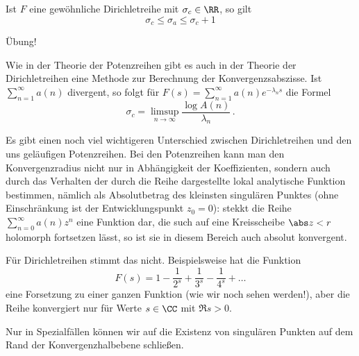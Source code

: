 \begin{satz}
	Ist $F$ eine gewöhnliche Dirichletreihe mit $\sigma_c \in \RR$, so gilt
	\[
		\sigma_c \leq \sigma_a \leq \sigma_c + 1
	\]
\end{satz}

\begin{bewe}
	Übung!
\end{bewe}

\begin{beme}
	Wie in der Theorie der Potenzreihen gibt es auch in der Theorie der Dirichletreihen eine Methode zur Berechnung der Konvergenzsabszisse.
	Ist $\sum_{n=1}^\infty a(n)$ divergent, so folgt für $F(s) = \sum_{n=1}^\infty a(n) e^{-\lambda_n s}$ die Formel
	\[
		\sigma_c = \limsup_{n\to\infty} \frac{\log{A(n)}}{\lambda_n}
		\,.
	\]
	
	Es gibt einen noch viel wichtigeren Unterschied zwischen Dirichletreihen und den uns geläufigen Potenzreihen.
	Bei den Potenzreihen kann man den Konvergenzradius nicht nur in Abhängigkeit der Koeffizienten, sondern auch durch das Verhalten der durch die Reihe dargestellte lokal analytische Funktion bestimmen, nämlich als Absolutbetrag des kleinsten singulären Punktes (ohne Einschränkung ist der Entwicklungspunkt $z_0 = 0$): stekkt die Reihe $\sum_{n=0}^\infty a(n)z^n$ eine Funktion dar, die such auf eine Kreisscheibe $\abs z < r$ holomorph fortsetzen lässt, so ist sie in diesem Bereich auch absolut konvergent.
	
	Für Dirichletreihen stimmt das nicht.
	Beispielsweise hat die Funktion
	\[
		F(s) = 1 - \frac 1{2^s} + \frac 1{3^s} - \frac 1{4^s} + \ldots
	\]
	eine Forsetzung zu einer ganzen Funktion (wie wir noch sehen werden!), aber die Reihe konvergiert nur für Werte $s \in \CC$ mit $\Re s > 0$.
	
	Nur in Spezialfällen können wir auf die Existenz von singulären Punkten auf dem Rand der Konvergenzhalbebene schließen.
\end{beme}

